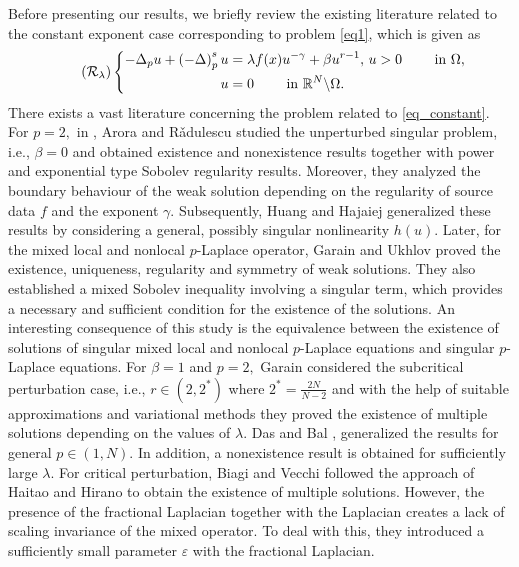 \documentclass[11pt]{article}
\newcommand{\ve}{\varepsilon}
\newcommand{\om} {\Omega}
\newcommand{\De} {\Delta}
\newcommand{\la} {\lambda}
\newcommand{\rnn}{\mathbb{R}^{N}}
\newcommand{\lb}{\left(}
\newcommand{\rb}{\right)}
\begin{document}
  
Before presenting our results, 
we briefly review the existing literature 
related to the constant exponent case 
corresponding to problem \eqref{eq1}, which is given as
\begin{equation*}\label{eq_constant}\tag{$\mathcal{R}_{\lambda}$}
   \left\{
	\begin{aligned}
-\De_{p}u+\lb -\De\rb^s_{p}u &=\lambda f(x) 
u^{-\gamma}+ \beta u^{r-1},\,u>0 \qquad \text{ in } \om,\\
		u &= 0 \qquad \text{ in } \rnn\backslash\om.
	\end{aligned}
    \right.
\end{equation*}
 There exists a vast literature concerning 
 the problem related to \eqref{eq_constant}.
For
$p=2,$
in
\cite{arora2025combined}, 
Arora and R\v{a}dulescu studied the 
unperturbed singular problem, i.e.,
$\beta = 0$
and obtained existence and nonexistence results 
together with power and exponential type Sobolev 
regularity results.
Moreover, they analyzed the boundary behaviour 
of the weak solution depending on the 
regularity of source data
$f$
and the exponent
$\gamma.$
Subsequently, Huang and Hajaiej
\cite{Shuibo} generalized these results by 
considering a general, possibly singular nonlinearity
$h(u).$
Later, for the mixed local and nonlocal
$p$-Laplace operator, Garain and Ukhlov
\cite{Garain1} proved the existence, uniqueness, 
regularity and symmetry of weak solutions.
They also established a mixed Sobolev inequality 
involving a singular term, which provides a 
necessary and sufficient condition for the 
existence of the solutions.
An interesting consequence of this study is 
the equivalence between the existence of 
solutions of singular mixed local and nonlocal
$p$-Laplace equations and singular
$p$-Laplace equations.
For
$\beta = 1$
and
$p =2,$
Garain
\cite{Garain2} considered the subcritical
 perturbation case, 
i.e.,
$r  \in (2, 2^*)$
where
$2^* = 
\frac{2N}{N-2}$
and with the help of suitable approximations and 
variational methods they proved the existence of 
multiple solutions depending on the values of
$\la.$
Das and Bal
\cite{bal2024multiplicitysolutionsmixedlocalnonlocal}, 
generalized the results for general
$p \in (1,N).$
In addition, a nonexistence result is 
obtained for sufficiently large
$\la.$
For critical perturbation, Biagi and Vecchi
\cite{Biagi} followed the approach of Haitao
\cite{Haito} and Hirano
\cite{hirano_2004} to obtain the 
existence of multiple solutions.
However, the presence of the fractional 
Laplacian together with the Laplacian 
creates a lack of scaling invariance of 
the mixed operator.
To deal with this, they introduced a 
sufficiently small parameter
$\ve$
with the fractional Laplacian.
\end{document}
